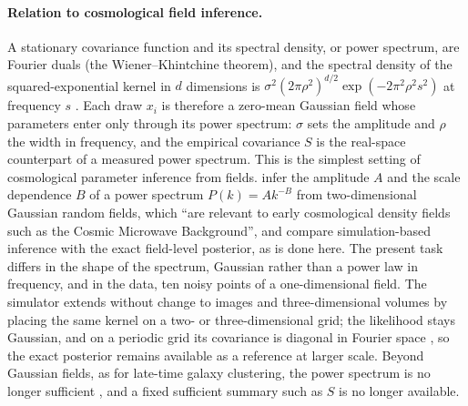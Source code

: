 \documentclass[11pt]{article}
\begin{document}
\paragraph{Relation to cosmological field inference.}
A stationary covariance function and its spectral density, or power spectrum, are Fourier duals (the
Wiener--Khintchine theorem), and the spectral density of the squared-exponential kernel in $d$ dimensions is
$\sigma^2(2\pi\rho^2)^{d/2}\exp(-2\pi^2\rho^2s^2)$ at frequency $s$ \citep[Sec.~4.2.1]{rasmussen2006gpml}. Each draw
$x_i$ is therefore a zero-mean Gaussian field whose parameters enter only through its power spectrum: $\sigma$ sets
the amplitude and $\rho$ the width in frequency, and the empirical covariance $S$ is the real-space counterpart of a
measured power spectrum. This is the simplest setting of cosmological parameter inference from fields.
\citet{makinen2021lossless} infer the amplitude $A$ and the scale dependence $B$ of a power spectrum $P(k)=Ak^{-B}$
from two-dimensional Gaussian random fields, which ``are relevant to early cosmological density fields such as the
Cosmic Microwave Background'', and compare simulation-based inference with the exact field-level posterior, as is
done here. The present task differs in the shape of the spectrum, Gaussian rather than a power law in frequency, and
in the data, ten noisy points of a one-dimensional field. The simulator extends without change to images and
three-dimensional volumes by placing the same kernel on a two- or three-dimensional grid; the likelihood stays
Gaussian, and on a periodic grid its covariance is diagonal in Fourier space \citep{makinen2021lossless}, so the
exact posterior remains available as a reference at larger scale. Beyond Gaussian fields, as for late-time galaxy
clustering, the power spectrum is no longer sufficient \citep{makinen2021lossless}, and a fixed sufficient summary
such as $S$ is no longer available.
\end{document}
